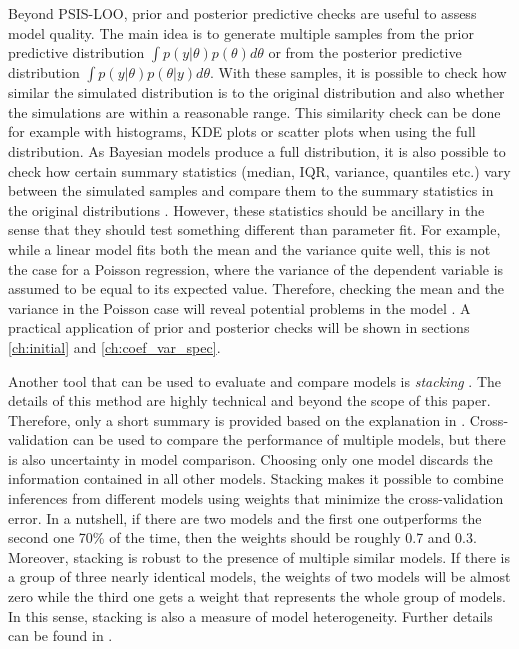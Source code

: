 Beyond PSIS-LOO, prior and posterior predictive checks are useful to assess model quality.
The main idea is to generate multiple samples from the prior predictive distribution $\int  p(y|\theta)p(\theta)d\theta$ or from the posterior predictive distribution $\int p(y | \theta) p(\theta|y) d\theta$.
With these samples, it is possible to check how similar the simulated distribution is to the original distribution and also whether the simulations are within a reasonable range.
This similarity check can be done for example with histograms, KDE plots or scatter plots when using the full distribution.
As Bayesian models produce a full distribution, it is also possible to check how certain summary statistics (median, IQR, variance, quantiles etc.) vary between the simulated samples and compare them to the summary statistics in the original distributions \citep[Chapter 6]{gelman_bayesian_2014}.
However, these statistics should be ancillary in the sense that they should test something different than parameter fit.
For example, while a linear model fits both the mean and the variance quite well, this is not the case for a Poisson regression, where the variance of the dependent variable is assumed to be equal to its expected value.
Therefore, checking the mean and the variance in the Poisson case will reveal potential problems in the model \citep[Chapter 27.3]{stan_development_team_stan_2021}.
A practical application of prior and posterior checks will be shown in sections \ref{ch:initial} and \ref{ch:coef_var_spec}.

Another tool that can be used to evaluate and compare models is \textit{stacking} \citep{yao_using_2018}.
The details of this method are highly technical and beyond the scope of this paper.
Therefore, only a short summary is provided based on the explanation in \cite{gelman_bayesian_2020}.
Cross-validation can be used to compare the performance of multiple models, but there is also uncertainty in model comparison.
Choosing only one model discards the information contained in all other models.
Stacking makes it possible to combine inferences from different models using weights that minimize the cross-validation error.
In a nutshell, if there are two models and the first one outperforms the second one 70\% of the time, then the weights should be roughly 0.7 and 0.3.
Moreover, stacking is robust to the presence of multiple similar models.
If there is a group of three nearly identical models, the weights of two models will be almost zero while the third one gets a weight that represents the whole group of models.
In this sense, stacking is also a measure of model heterogeneity.
Further details can be found in \cite{yao_using_2018}.




